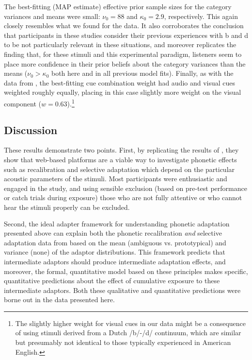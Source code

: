 The best-fitting (MAP estimate) effective prior sample sizes for the category variances and means were small: $\nu_0 = 88$ and $\kappa_0=2.9$, respectively.  This again closely resembles what we found for the  data.  It also corroborates the conclusion that participants in these studies consider their previous experiences with \ph b and \ph d to be not particularly relevant in these situations, 
and moreover replicates the finding that, for these stimuli and this experimental paradigm, listeners seem to place more confidence in their prior beliefs about the category variances than the means ($\nu_0 > \kappa_0$ both here and in all previous model fits).  Finally, as with the data from , the best-fitting cue combination weight had audio and visual cues weighted roughly equally, placing in this case slightly more weight on the visual component ($w=0.63$).\footnote{The slightly higher weight for visual cues in our data might be a consequence of using stimuli derived from a Dutch /b/-/d/ continuum, which are similar but presumably not identical to those typically experienced in American English.}

\subsection{Discussion}
\label{sec:discussion-3}

These results demonstrate two points.  First, by replicating the results of , they show that web-based platforms are a viable way to investigate phonetic effects such as recalibration and selective adaptation which depend on the particular acoustic parameters of the stimuli.  Most participants were enthusiastic and engaged in the study, and using sensible exclusion (based on pre-test performance or catch trials during exposure) those who are not fully attentive or who cannot hear the stimuli properly can be excluded.

Second, the ideal adapter framework for understanding phonetic adaptation presented above can explain both the phonetic recalibration \emph{and} selective adaptation data from  based on the mean (ambiguous vs. prototypical) and variance (none) of the adaptor distributions.  This framework predicts that intermediate adaptors should produce intermediate adaptation effects, and moreover, the formal, quantitative model based on these principles makes specific, quantitative predictions about the effect of cumulative exposure to these intermediate adaptors.  Both these qualitative and quantitative predictions were borne out in the data presented here.

